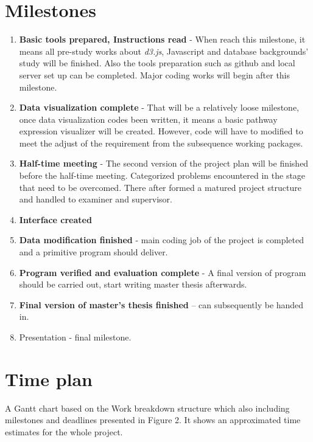 \documentclass[a4paper]{article}
\begin{document}
\section{Milestones}
\begin{enumerate}
  \item \textbf{Basic tools prepared, Instructions read} - When reach this milestone, it means all pre-study works about \textit{d3.js}, Javascript and database backgrounds' study will be finished. Also the tools preparation such as github and local server set up can be completed. Major coding works will begin after this milestone. 
  \item \textbf{Data visualization complete} - That will be a relatively loose milestone, once data visualization codes been written,  it means a basic pathway expression visualizer will be created. However, code will have to modified to meet the adjust of the requirement from the subsequence working packages.
  \item \textbf{Half-time meeting} - The second version of the project plan will be finished before the half-time meeting. Categorized problems encountered in the stage that need to be overcomed. There after formed a matured project structure and handled to examiner and supervisor.
  \item \textbf{Interface created} 
  \item \textbf{Data modification finished} -  main coding job of the project is completed and a primitive program should deliver.
  \item \textbf{Program verified and evaluation complete} - A final version of program should be carried out, start writing master thesis afterwards.
  \item \textbf{Final version of master’s thesis finished} – can subsequently be handed in. 
  \item Presentation - final milestone.
\end{enumerate}

\section{Time plan}

A Gantt chart based on the Work breakdown structure which also including milestones and deadlines presented in Figure 2. It shows an approximated time estimates for the whole project.
\end{document}
